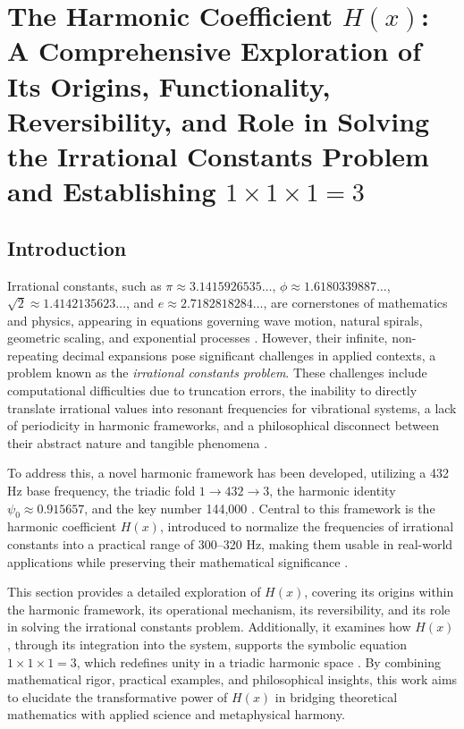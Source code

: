 
\section{The Harmonic Coefficient \( H(x) \): A Comprehensive Exploration of Its Origins, Functionality, Reversibility, and Role in Solving the Irrational Constants Problem and Establishing \( 1 \times 1 \times 1 = 3 \)}
\label{sec:h_x}

\subsection{Introduction}
\label{subsec:h_x_introduction}
Irrational constants, such as \( \pi \approx 3.1415926535\ldots \), \( \phi \approx 1.6180339887\ldots \), \( \sqrt{2} \approx 1.4142135623\ldots \), and \( e \approx 2.7182818284\ldots \), are cornerstones of mathematics and physics, appearing in equations governing wave motion, natural spirals, geometric scaling, and exponential processes \cite{irrational_constant_solved}. However, their infinite, non-repeating decimal expansions pose significant challenges in applied contexts, a problem known as the \textit{irrational constants problem}. These challenges include computational difficulties due to truncation errors, the inability to directly translate irrational values into resonant frequencies for vibrational systems, a lack of periodicity in harmonic frameworks, and a philosophical disconnect between their abstract nature and tangible phenomena \cite{irrational_constant_solved}.

To address this, a novel harmonic framework has been developed, utilizing a 432 Hz base frequency, the triadic fold \( 1 \rightarrow 432 \rightarrow 3 \), the harmonic identity \( \psi_0 \approx 0.915657 \), and the key number 144,000 \cite{revelation, harmonic_reversible, irrational_constant_solved}. Central to this framework is the harmonic coefficient \( H(x) \), introduced to normalize the frequencies of irrational constants into a practical range of 300--320 Hz, making them usable in real-world applications while preserving their mathematical significance \cite{irrational_constant_solved}.

This section provides a detailed exploration of \( H(x) \), covering its origins within the harmonic framework, its operational mechanism, its reversibility, and its role in solving the irrational constants problem. Additionally, it examines how \( H(x) \), through its integration into the system, supports the symbolic equation \( 1 \times 1 \times 1 = 3 \), which redefines unity in a triadic harmonic space \cite{revelation}. By combining mathematical rigor, practical examples, and philosophical insights, this work aims to elucidate the transformative power of \( H(x) \) in bridging theoretical mathematics with applied science and metaphysical harmony.

